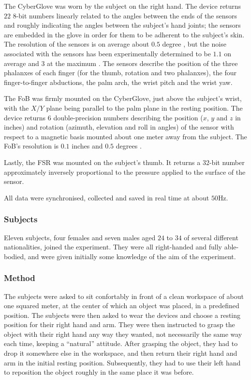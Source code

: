 The CyberGlove was worn by the subject on the right hand. The device
returns $22$ $8$-bit numbers linearly related to the angles between
the ends of the sensors and roughly indicating the angles between the
subject's hand joints; the sensors are embedded in the glove in order
for them to be adherent to the subject's skin. The resolution of the
sensors is on average about $0.5$ degree \cite{cyberglove}, but the
noise associated with the sensors has been experimentally determined
to be $1.1$ on average and $3$ at the maximum \cite{212431}. The
sensors describe the position of the three phalanxes of each finger
(for the thumb, rotation and two phalanxes), the four finger-to-finger
abductions, the palm arch, the wrist pitch and the wrist yaw.

The FoB was firmly mounted on the CyberGlove, just above the subject's
wrist, with the $X/Y$ plane being parallel to the palm plane in the
resting position. The device returns $6$ double-precision numbers
describing the position ($x$, $y$ and $z$ in inches) and rotation
(azimuth, elevation and roll in angles) of the sensor with respect to
a magnetic basis mounted about one meter away from the subject. The
FoB's resolution is $0.1$ inches and $0.5$ degrees \cite{fob}.

Lastly, the FSR was mounted on the subject's thumb. It returns a
$32$-bit number approximately inversely proportional to the pressure
applied to the surface of the sensor.

All data were synchronised, collected and saved in real time at about
$50$Hz.

\subsubsection*{Subjects}

Eleven subjects, four females and seven males aged $24$ to $34$ of
several different nationalities, joined the experiment. They were all
right-handed and fully able-bodied, and were given initially some
knowledge of the aim of the experiment.

\subsubsection*{Method}

The subjects were asked to sit confortably in front of a clean
workspace of about one squared meter, at the center of which an object
was placed, in a predefined position. The subjects were then asked to
wear the devices and choose a resting position for their right hand
and arm. They were then instructed to grasp the object with their
right hand any way they wanted, not necessarily the same way each
time, keeping a ``natural'' attitude. After grasping the object, they
had to drop it somewhere else in the workspace, and then return their
right hand and arm in the initial resting position. Subsequently, they
had to use their left hand to reposition the object roughly in the
same place it was before.

